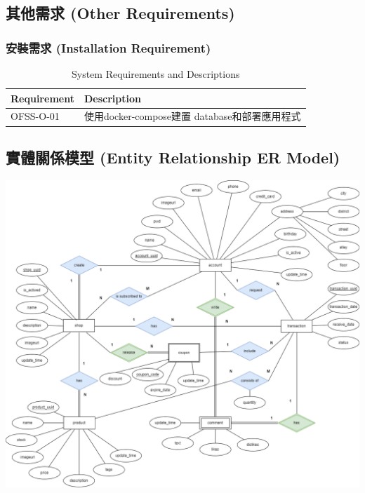 \documentclass[a4paper, 12pt]{article}
\begin{document}
\subsection{其他需求 (Other Requirements)}
\subsubsection{安裝需求 (Installation Requirement)}
\begin{table}[h]
    \centering
    \renewcommand{\arraystretch}{1.35}
    \begin{tabular}{|p{3cm}|p{10cm}|}
        \hline
        \textbf{Requirement} & \textbf{Description} \\
        \hline
        OFSS-O-01 & 使用docker-compose建置 database和部署應用程式 \\
        \hline
    \end{tabular}
    \caption{System Requirements and Descriptions}
    \label{tab:system-requirements}
\end{table}

\newpage
\subsection{實體關係模型 (Entity Relationship ER Model)}
\includegraphics[scale=0.35]{image/nft_er_diagram.png}
\newpage
\end{document}
